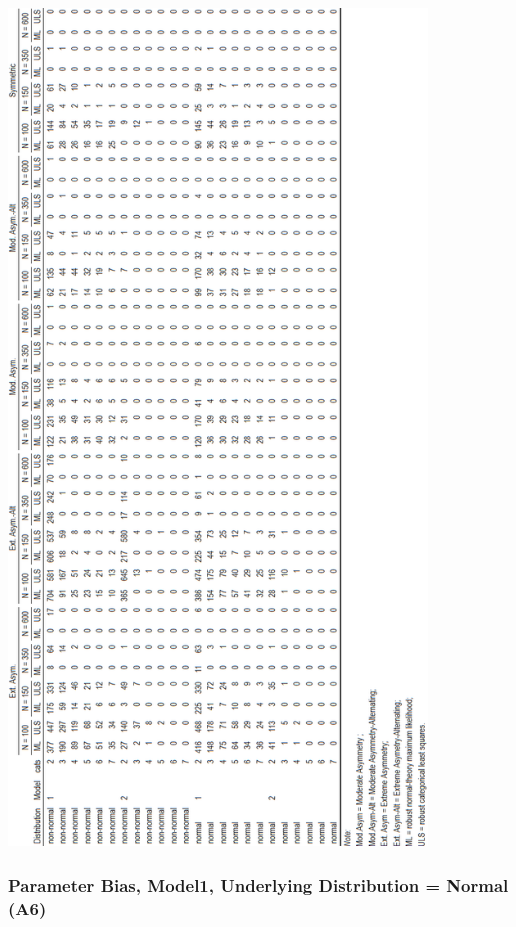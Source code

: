 \documentclass[10,a4paperpaper,]{article}
\begin{document}
\includegraphics[width=315pt]{./figures/tabA4_A5}

\subsubsection{Parameter Bias, Model1, Underlying Distribution = Normal (A6)}
\end{document}
